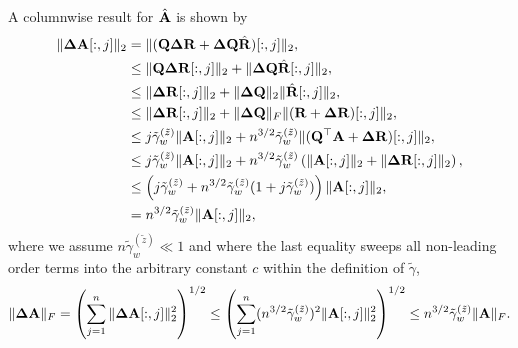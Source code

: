 A columnwise result for $\hat{\mathbf{A}}$ is shown by
\begin{align*}
\|\mathbf{\Delta A}[:,j]\|_2 & = \|(\mathbf{Q \Delta R} + \mathbf{\Delta Q} \hat{\mathbf{R}} )[:,j]\|_2,\\
&\leq \|\mathbf{Q \Delta R}[:,j]\|_2  + \|\mathbf{\Delta Q}\hat{\mathbf{R}}[:,j]\|_2,\\
&\leq \|\mathbf{\Delta R}[:,j]\|_2 + \|\mathbf{\Delta Q}\|_2\|\hat{\mathbf{R}}[:,j]\|_2,\\
&\leq \|\mathbf{\Delta R}[:,j]\|_2 + \|\mathbf{\Delta Q}\|_F\|(\mathbf{R} +\mathbf{\Delta R})[:,j]\|_2,\\
&\leq j\tilde{\gamma}_w^{(\tilde{z})}\|\mathbf{A}[:,j]\|_2 + n^{3/2}\tilde{\gamma}_w^{(\tilde{z})} \|(\mathbf{Q}^{\top}\mathbf{A} +\mathbf{\Delta R})[:,j]\|_2,\\
&\leq j\tilde{\gamma}_w^{(\tilde{z})}\|\mathbf{A}[:,j]\|_2 + n^{3/2}\tilde{\gamma}_w^{(\tilde{z})} \left(\|\mathbf{A}[:,j]\|_2 +\|\mathbf{\Delta R}[:,j]\|_2\right),\\
&\leq \left(j\tilde{\gamma}_w^{(\tilde{z})} + n^{3/2}\tilde{\gamma}_w^{(\tilde{z})}  (1+j\tilde{\gamma}_w^{(\tilde{z})})\right)\|\mathbf{A}[:,j]\|_2,\\
&=n^{3/2}\tilde{\gamma}_w^{(\tilde{z})}  \|\mathbf{A}[:,j]\|_2,
\end{align*}
where we assume $n\tilde{\gamma}_w^{(\tilde{z})}\ll 1$ and where the last equality sweeps all non-leading order terms into the arbitrary constant $c$ within the definition of $\tilde{\gamma}$,
\begin{equation}
\|\mathbf{\Delta A}\|_F = \left(\sum_{j=1}^n \|\mathbf{\Delta A}[:,j]\|_2^2\right)^{1/2} \leq \left(\sum_{j=1}^n (n^{3/2}\tilde{\gamma}_w^{(\tilde{z})})^2 \|\mathbf{A}[:,j]\|_2^2\right)^{1/2} \leq n^{3/2}\tilde{\gamma}_w^{(\tilde{z})} \|\mathbf{A}\|_F.
\end{equation}

